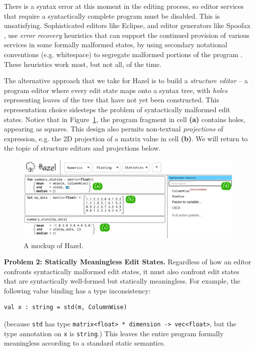 \documentclass{purple}
\let\li\lstinline
\newcommand{\Hazel}[0]{\textsf{Hazel}\xspace}
\newcommand{\HazelEnv}[0]{\Hazel\xspace}
\begin{document}
There is a syntax
error at this moment in the editing process, so editor services that require a syntactically
complete program must be disabled. This is unsatisfying. Sophisticated editors like Eclipse, and editor generators like Spoofax \cite{DBLP:conf/oopsla/KatsV10}, use \emph{error recovery} heuristics that can support the continued provision 
of various services in some formally malformed states, by using secondary notational conventions (e.g. whitespace) to segregate malformed portions of the program  \cite{DBLP:conf/oopsla/KatsJNV09,DBLP:conf/sle/JongeNKV09}. These heuristics work most, but not all, of the time.

The alternative approach that we take for \HazelEnv is to build a
\emph{structure editor} -- a program editor where every edit state
maps onto a syntax tree, with \emph{holes} representing leaves of the tree
that have not yet been constructed.  This representation choice sidesteps the
problem of syntactically malformed edit states. Notice that in
Figure~\ref{fig:hazel-mockup}, the program fragment in cell
\textbf{(a)} contains holes, appearing as squares. This design also permits
non-textual \emph{projections} of expression, e.g. 
the 2D projection of a matrix value in cell \textbf{(b)}.
We will return to the topic of structure editors and projections below.


\begin{figure}
\includegraphics[width=\textwidth]{mockup-1}
\caption{A mockup of \HazelEnv.}
\label{fig:hazel-mockup}
\vspace{-2ex}
\end{figure}

\vspace{0.25ex}
\noindent\textbf{Problem 2: Statically Meaningless Edit States.} Regardless of how an 
editor confronts syntactically malformed edit states, it must also confront 
edit states that are syntactically well-formed but statically meaningless. For
example, the following value binding has a type inconsistency:
\begin{lstlisting}[numbers=none]
val x : string = std(m, ColumnWise)
\end{lstlisting}
(because \li{std} has type \li{matrix<float> * dimension -> vec<float>},
but the type annotation on \li{x} is \li{string}.) This leaves the entire program
formally meaningless according to a standard static semantics.
\end{document}

